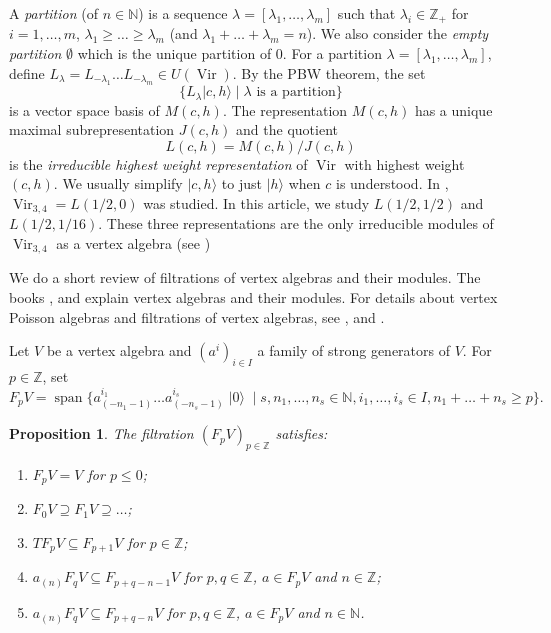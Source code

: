\documentclass[a4paper, 12pt, reqno]{amsart}
\newtheorem{proposition}[theorem]{Proposition}
\theoremstyle{remark}
\DeclareMathOperator{\Vir}{Vir}
\DeclareMathOperator{\vspan}{span}
\DeclareMathOperator{\vac}{|0\rangle}
\begin{document}
A \emph{partition} (of $n \in \mathbb{N}$) is a sequence $\lambda = [\lambda_1, \dots, \lambda_m]$ such that $\lambda_i \in \mathbb{Z}_+$ for $i = 1, \dots, m$, $\lambda_1 \ge \dots \ge \lambda_m$ (and $\lambda_1 + \dots + \lambda_m = n$).
We also consider the \emph{empty partition} $\emptyset$ which is the unique partition of $0$.
For a partition $\lambda = [\lambda_1, \dots, \lambda_m]$, define $L_{\lambda} = L_{-\lambda_1}\dots L_{-\lambda_m} \in U(\Vir)$.
By the PBW theorem, the set
\begin{equation*}
  \{L_\lambda|c,h\rangle \mid \lambda\text{ is a partition}\}
\end{equation*}
is a vector space basis of $M(c, h)$.
The representation $M(c, h)$ has a unique maximal subrepresentation $J(c, h)$ and the quotient
\begin{equation*}
  L(c, h) = M(c, h)/J(c, h)
\end{equation*}
is the \emph{irreducible highest weight representation} of $\Vir$ with highest weight $(c, h)$.
We usually simplify $|c, h\rangle$ to just $|h\rangle$ when $c$ is understood.
In \cite{andrews_singular_2022}, $\Vir_{3, 4} = L(1/2, 0)$ was studied.
In this article, we study $L(1/2, 1/2)$ and $L(1/2, 1/16)$.
These three representations are the only irreducible modules of $\Vir_{3, 4}$ as a vertex algebra (see \cite[Theorem 4.2]{wang_rationality_1993})

We do a short review of filtrations of vertex algebras and their modules.
The books \cite{kac_vertex_1998}, \cite{frenkel_vertex_2001} and \cite{lepowsky_introduction_2004} explain vertex algebras and their modules.
For details about vertex Poisson algebras and filtrations of vertex algebras, see \cite{li_vertex_2004}, \cite{li_abelianizing_2005} and \cite{arakawa_remark_2012}.

Let $V$ be a vertex algebra and $(a^i)_{i \in I}$ a family of strong generators of $V$.
For $p \in \mathbb{Z}$, set
\begin{equation*}
  F_pV = \vspan\{a^{i_1}_{(-n_1 - 1)}\dots a^{i_s}_{(-n_s - 1)}\vac \mid s, n_1, \dots, n_s \in \mathbb{N}, i_1, \dots, i_s \in I, n_1 + \dots + n_s \ge p\}.
\end{equation*}

\begin{proposition}
  \label{prp:1}
  The filtration $(F_pV)_{p \in \mathbb{Z}}$ satisfies:
  \begin{enumerate}
  \item $F_pV = V$ for $p \le 0$;
  \item $F_0V \supseteq F_1V \supseteq \dots$;
  \item $TF_pV \subseteq F_{p + 1}V$ for $p \in \mathbb{Z}$;
  \item $a_{(n)}F_qV \subseteq F_{p + q - n - 1}V$ for $p, q \in \mathbb{Z}$, $a \in F_pV$ and $n \in \mathbb{Z}$;
  \item $a_{(n)}F_qV \subseteq F_{p + q - n}V$ for $p, q \in \mathbb{Z}$, $a \in F_pV$ and $n \in \mathbb{N}$.
  \end{enumerate}
\end{proposition}
\end{document}
